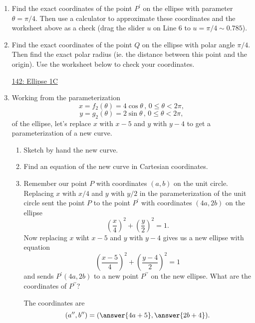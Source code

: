 \documentclass{ximera}
\begin{document}
\begin{example}
\begin{enumerate}
\item Find the exact coordinates of the point $P^\prime$ on the ellipse with parameter $\theta=\pi/4$. Then use a calculator to approximate these coordinates and the worksheet above as a check (drag the slider $u$ on Line 6 to $u=\pi/4 \sim 0.785$).

\item Find the exact coordinates of the point $Q$ on the ellipse with polar angle $\pi/4$. Then find the exact polar radius (ie. the distance between this point and the origin). Use the worksheet below to check your coordinates.

\begin{onlineOnly}
    \begin{center}
\end{center}
\end{onlineOnly}

\href{https://www.desmos.com/calculator/4ayj4l4hca}{142: Ellipse 1C}





\item Working from the parameterization 
\[ 
     x = f_2 (\theta) = 4\cos\theta \, , \, 0\leq \theta <2\pi ,
\]
\[
   y = g_2 (\theta) = 2\sin\theta \, , \, 0\leq \theta <2\pi ,
\]
of the ellipse, let's replace $x$ with $x-5$ and $y$ with $y-4$ to get a parameterization of a new curve.

\begin{enumerate}
\item Sketch by hand the new curve.

\item Find an equation of the new curve in Cartesian coordinates.

\item Remember our point $P$ with coordinates $(a,b)$ on the unit circle. Replacing $x$ with $x/4$ and $y$ with $y/2$ in the parameterization of the unit circle sent the point $P$ to the point $P^\prime$ with coordinates $(4a, 2b)$ on the ellipse
\[
  \left( \frac{x}{4} \right)^2 + \left( \frac{y}{2} \right)^2 = 1.
\]
Now replacing $x$ wiht $x-5$ and $y$ with $y-4$ gives us a new ellipse with equation
\[
  \left( \frac{x-5}{4} \right)^2 + \left( \frac{y-4}{2} \right)^2 = 1
\]
and sends $P^\prime(4a,2b)$ to a new point $P^{\prime\prime}$ on the new ellipse. What are the coordinates of $P^{\prime\prime}$?

The coordinates are 
\[
   (a^{\prime\prime} , b^{\prime\prime}) = (\answer{4a+5} , \answer{2b+4} ) .
\]


\end{enumerate}

\end{enumerate}
\end{example}
\end{document}
